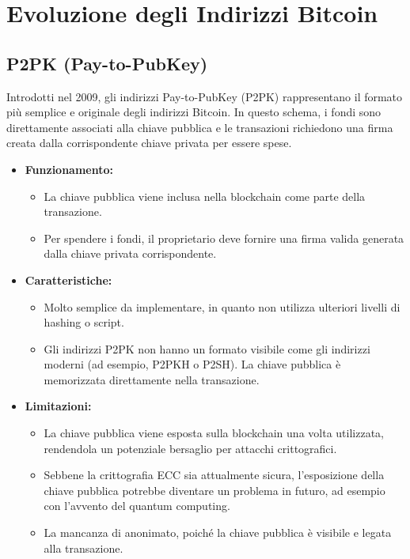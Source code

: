 \documentclass{article}
\begin{document}
\section{Evoluzione degli Indirizzi Bitcoin}

\subsection{P2PK (Pay-to-PubKey)}
Introdotti nel 2009, gli indirizzi Pay-to-PubKey (P2PK) rappresentano il formato più semplice e originale degli indirizzi Bitcoin. In questo schema, i fondi sono direttamente associati alla chiave pubblica e le transazioni richiedono una firma creata dalla corrispondente chiave privata per essere spese.

\begin{itemize}
    \item \textbf{Funzionamento:}
    \begin{itemize}
        \item La chiave pubblica viene inclusa nella blockchain come parte della transazione.
        \item Per spendere i fondi, il proprietario deve fornire una firma valida generata dalla chiave privata corrispondente.
    \end{itemize}
    \item \textbf{Caratteristiche:}
    \begin{itemize}
        \item Molto semplice da implementare, in quanto non utilizza ulteriori livelli di hashing o script.
        \item Gli indirizzi P2PK non hanno un formato visibile come gli indirizzi moderni (ad esempio, P2PKH o P2SH). La chiave pubblica è memorizzata direttamente nella transazione.
    \end{itemize}
    \item \textbf{Limitazioni:}
    \begin{itemize}
        \item La chiave pubblica viene esposta sulla blockchain una volta utilizzata, rendendola un potenziale bersaglio per attacchi crittografici.
        \item Sebbene la crittografia ECC sia attualmente sicura, l'esposizione della chiave pubblica potrebbe diventare un problema in futuro, ad esempio con l'avvento del quantum computing.
        \item La mancanza di anonimato, poiché la chiave pubblica è visibile e legata alla transazione.
    \end{itemize}

\end{itemize}
\end{document}
